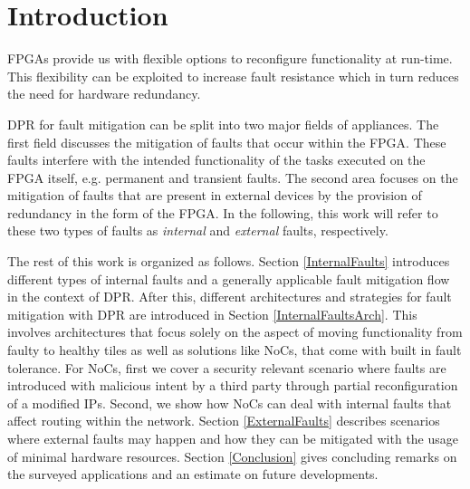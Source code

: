 
\section{Introduction}\label{Introduction}
\glspl{FPGA} provide us with flexible options to reconfigure functionality at run-time. 
This flexibility can be exploited to increase fault resistance which in turn reduces the need for hardware redundancy. 

\gls{DPR} for fault mitigation can be split into two major fields of appliances. 
The first field discusses the mitigation of faults that occur within the \gls{FPGA}.
These faults interfere with the intended functionality of the tasks executed on the \gls{FPGA} itself, e.g. permanent and transient faults. 
The second area focuses on the mitigation of faults that are present in external devices by the provision of redundancy in the form of the \gls{FPGA}.
In the following, this work will refer to these two types of faults as \textit{internal} and \textit{external} faults, respectively.

The rest of this work is organized as follows.
Section \ref{InternalFaults} introduces different types of internal faults and a generally applicable fault mitigation flow in the context of \gls{DPR}.
After this, different architectures and strategies for fault mitigation with \gls{DPR} are introduced in Section \ref{InternalFaultsArch}.
This involves architectures that focus solely on the aspect of moving functionality from faulty to healthy tiles as well as solutions like \glspl{NoC}, that come with built in fault tolerance. 
For \glspl{NoC}, first we cover a security relevant scenario where faults are introduced with malicious intent by a third party through partial reconfiguration of a modified \glspl{IP}.
Second, we show how \glspl{NoC} can deal with internal faults that affect routing within the network.  
Section \ref{ExternalFaults} describes scenarios where external faults may happen and how they can be mitigated with the usage of minimal hardware resources. 
Section \ref{Conclusion} gives concluding remarks on the surveyed applications and an estimate on future developments.

